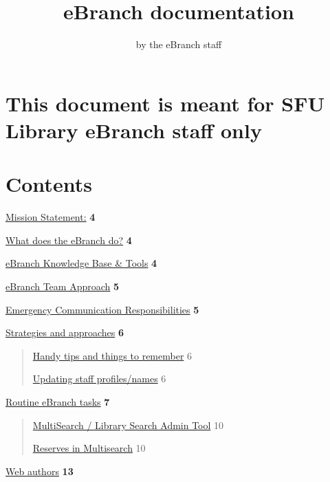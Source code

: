 \documentclass[
  openany]{book}
\title{eBranch documentation}
\author{by the eBranch staff}
\date{}
\begin{document}
\maketitle

{
\setcounter{tocdepth}{1}
\tableofcontents
}
\hypertarget{this-document-is-meant-for-sfu-library-ebranch-staff-only}{%
\chapter{This document is meant for SFU Library eBranch staff only}\label{this-document-is-meant-for-sfu-library-ebranch-staff-only}}

\hypertarget{contents}{%
\chapter{Contents}\label{contents}}

\protect\hyperlink{mission-statement}{Mission Statement:} \textbf{4}

\protect\hyperlink{what-does-the-ebranch-do}{What does the eBranch do?} \textbf{4}

\protect\hyperlink{ebranch-knowledge-base-tools}{eBranch Knowledge Base \& Tools} \textbf{4}

\protect\hyperlink{ebranch-team-approach}{eBranch Team Approach} \textbf{5}

\protect\hyperlink{emergency-communication-responsibilities}{Emergency Communication
Responsibilities} \textbf{5}

\protect\hyperlink{strategies-and-approaches}{Strategies and approaches} \textbf{6}

\begin{quote}
\protect\hyperlink{handy-tips-and-things-to-remember}{Handy tips and things to
remember} 6

\protect\hyperlink{updating-staff-profilesnames}{Updating staff profiles/names} 6
\end{quote}

\protect\hyperlink{routine-ebranch-tasks}{Routine eBranch tasks} \textbf{7}

\begin{quote}
\protect\hyperlink{multisearch-library-search-admin-tool}{MultiSearch / Library Search Admin
Tool} 10

\protect\hyperlink{reserves-in-multisearch}{Reserves in Multisearch} 10
\end{quote}

\protect\hyperlink{web-authors}{Web authors} \textbf{13}
\end{document}
